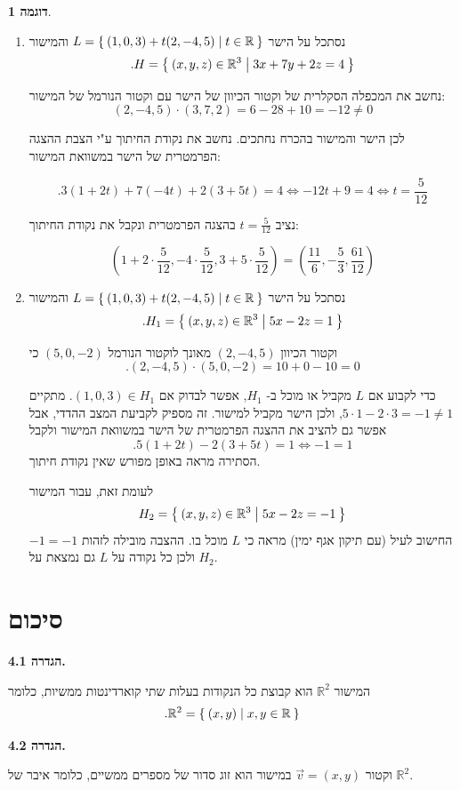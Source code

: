 \documentclass[12pt]{report}
\theoremstyle{plain}
\theoremstyle{definition}
\newtheorem{example}{דוגמה}[chapter]
\newcommand{\R}{\mathbb{R}}
\newcommand{\0}{\mathbf{0}}
\begin{document}
\begin{example}\
\begin{enumerate}[label=\alph*.]
\item 
נסתכל על הישר
$L=\Set{(1,0,3)+t(2,-4,5)|t\in\R}$
והמישור
$$
.H=\Set{(x,y,z)\in\R^3|3x+7y+2z=4}
$$

נחשב את המכפלה הסקלרית של וקטור הכיוון של הישר עם וקטור הנורמל של המישור:
$$
(2,-4,5)\cdot(3,7,2)=6-28+10=-12\neq 0
$$

לכן הישר והמישור בהכרח נחתכים. נחשב את נקודת החיתוך ע"י הצבת ההצגה הפרמטרית של הישר במשוואת המישור:

$$
.3(1+2t)+7(-4t)+2(3+5t)=4 \iff -12t+9=4 \iff t=\frac{5}{12}
$$

נציב
$t=\frac{5}{12}$
בהצגה הפרמטרית ונקבל את נקודת החיתוך:

$$
(1+2\cdot\frac{5}{12},-4\cdot\frac{5}{12},3+5\cdot\frac{5}{12})=(\frac{11}{6},-\frac{5}{3},\frac{61}{12})
$$

\item 

נסתכל על הישר
$L=\Set{(1,0,3)+t(2,-4,5)|t\in\R}$
והמישור
$$
.H_1=\Set{(x,y,z)\in\R^3|5x-2z=1}
$$

וקטור הכיוון
$(2,-4,5)$
מאונך לוקטור הנורמל
$(5,0,-2)$
כי
$$
.(2,-4,5)\cdot(5,0,-2)=10+0-10=0
$$

כדי לקבוע אם 
$L$
מקביל או מוכל ב-
$H_1$,
אפשר לבדוק אם
$(1,0,3)\in H_1$.
מתקיים
$5\cdot1-2\cdot3=-1\neq1$, 
ולכן הישר מקביל למישור. זה מספיק לקביעת המצב ההדדי, אבל אפשר גם להציב את ההצגה הפרמטרית של הישר במשוואת המישור ולקבל
$$
.5(1+2t)-2(3+5t)=1 \iff -1=1
$$
הסתירה מראה באופן מפורש שאין נקודת חיתוך.

לעומת זאת, עבור המישור
$$
H_2=\Set{(x,y,z)\in\R^3|5x-2z=-1}
$$
החישוב לעיל (עם תיקון אגף ימין) מראה כי 
$L$
מוכל בו. ההצבה מובילה לזהות
$-1=-1$
ולכן כל נקודה על 
$L$
גם נמצאת על
$H_2$.

\end{enumerate}
\end{example}

\clearpage
\section{סיכום}
\noindent\textbf{הגדרה 4.1.}

המישור
$\R^2$
הוא קבוצת כל הנקודות בעלות שתי
קוארדינטות ממשיות, כלומר
$$
.\R^2=\Set{(x,y)|x,y\in\R}
$$
\bigskip
\bigskip

\noindent\textbf{הגדרה 4.2.}

וקטור
$\vec{v}=(x,y)$ 
במישור הוא זוג סדור של מספרים ממשיים, כלומר איבר של
$\R^2$.
\bigskip
\bigskip
\end{document}
